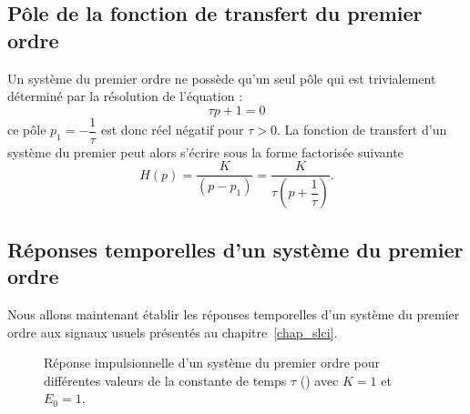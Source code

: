 \subsection{Pôle de la fonction de transfert du premier ordre}
Un système du premier ordre ne possède qu'un seul pôle qui est trivialement 
déterminé par la résolution de l'équation :
$$
\tau p + 1 =0
$$
ce pôle $p_1=-\dfrac{1}{\tau}$ est donc réel négatif pour $\tau>0$.
La fonction de transfert d'un système du premier peut alors s'écrire 
sous la forme factorisée suivante
$$
H(p)=\dfrac{K}{(p-p_1)}=\dfrac{K}{\tau\left(p+\dfrac{1}{\tau}\right)}.
$$

\subsection{Réponses temporelles d'un système du premier ordre}
Nous allons maintenant établir les réponses temporelles d'un système 
du premier ordre aux signaux usuels présentés au chapitre~\cref{chap_slci}.

\begin{figure}[!t]
\begin{center}
\caption{Réponse impulsionnelle d'un système du premier ordre pour 
         différentes valeurs de la constante de temps $\tau$  
         () avec $K=1$ et $E_0=1$.\label{fig-1er_imp}}
\end{center}
\end{figure}

